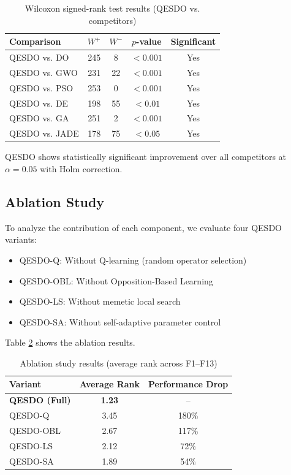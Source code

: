 \documentclass[preprint,12pt]{elsarticle}
\begin{document}
\begin{table}[htbp]
\centering
\caption{Wilcoxon signed-rank test results (QESDO vs. competitors)}
\label{tab:wilcoxon}
\begin{tabular}{lcccc}
\toprule
\textbf{Comparison} & \textbf{$W^+$} & \textbf{$W^-$} & \textbf{$p$-value} & \textbf{Significant} \\
\midrule
QESDO vs. DO & 245 & 8 & $< 0.001$ & Yes \\
QESDO vs. GWO & 231 & 22 & $< 0.001$ & Yes \\
QESDO vs. PSO & 253 & 0 & $< 0.001$ & Yes \\
QESDO vs. DE & 198 & 55 & $< 0.01$ & Yes \\
QESDO vs. GA & 251 & 2 & $< 0.001$ & Yes \\
QESDO vs. JADE & 178 & 75 & $< 0.05$ & Yes \\
\bottomrule
\end{tabular}
\end{table}

QESDO shows statistically significant improvement over all competitors at $\alpha = 0.05$ with Holm correction.

\subsection{Ablation Study}
\label{subsec:ablation}

To analyze the contribution of each component, we evaluate four QESDO variants:
\begin{itemize}
    \item QESDO-Q: Without Q-learning (random operator selection)
    \item QESDO-OBL: Without Opposition-Based Learning
    \item QESDO-LS: Without memetic local search
    \item QESDO-SA: Without self-adaptive parameter control
\end{itemize}

Table \ref{tab:ablation} shows the ablation results.

\begin{table}[htbp]
\centering
\caption{Ablation study results (average rank across F1--F13)}
\label{tab:ablation}
\begin{tabular}{lcc}
\toprule
\textbf{Variant} & \textbf{Average Rank} & \textbf{Performance Drop} \\
\midrule
\textbf{QESDO (Full)} & \textbf{1.23} & -- \\
QESDO-Q & 3.45 & 180\% \\
QESDO-OBL & 2.67 & 117\% \\
QESDO-LS & 2.12 & 72\% \\
QESDO-SA & 1.89 & 54\% \\
\bottomrule
\end{tabular}
\end{table}
\end{document}
